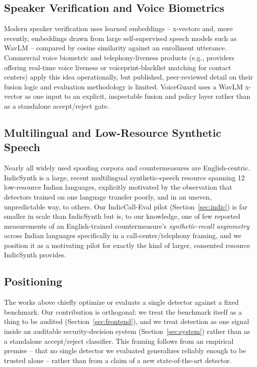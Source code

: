 \documentclass[conference]{IEEEtran}
\begin{document}
\subsection{Speaker Verification and Voice Biometrics}
Modern speaker verification uses learned embeddings -- x-vectors
\cite{xvectors} and, more recently, embeddings drawn from large
self-supervised speech models such as WavLM \cite{wavlm} -- compared by
cosine similarity against an enrollment utterance. Commercial voice
biometric and telephony-liveness products (e.g., providers offering
real-time voice liveness or voiceprint-blacklist matching for contact
centers) apply this idea operationally, but published, peer-reviewed
detail on their fusion logic and evaluation methodology is limited.
VoiceGuard uses a WavLM x-vector as one input to an explicit,
inspectable fusion and policy layer rather than as a standalone
accept/reject gate.

\subsection{Multilingual and Low-Resource Synthetic Speech}
Nearly all widely used spoofing corpora and countermeasures are
English-centric. IndicSynth \cite{indicsynth} is a large, recent
multilingual synthetic-speech resource spanning 12 low-resource Indian
languages, explicitly motivated by the observation that detectors
trained on one language transfer poorly, and in an uneven, unpredictable
way, to others. Our IndicCall-Eval pilot (Section~\ref{sec:indic}) is
far smaller in scale than IndicSynth but is, to our knowledge, one of
few reported measurements of an English-trained countermeasure's
\emph{synthetic-recall asymmetry} across Indian languages specifically
in a call-center/telephony framing, and we position it as a motivating
pilot for exactly the kind of larger, consented resource IndicSynth
provides.

\subsection{Positioning}
The works above chiefly optimize or evaluate a single detector against
a fixed benchmark. Our contribution is orthogonal: we treat the
benchmark itself as a thing to be audited (Section~\ref{sec:frontend}),
and we treat detection as one signal inside an auditable
security-decision system (Section~\ref{sec:system}) rather than as a
standalone accept/reject classifier. This framing follows from an
empirical premise -- that no single detector we evaluated generalizes
reliably enough to be trusted alone -- rather than from a claim of a
new state-of-the-art detector.
\end{document}
